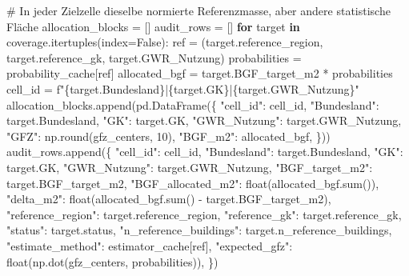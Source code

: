 \documentclass[
  ngerman,
  a4paper,
  DIV=11]{scrreprt}
\newenvironment{Shaded}{\begin{snugshade}}{\end{snugshade}}
\newcommand{\BuiltInTok}[1]{\textcolor[rgb]{0.00,0.23,0.31}{#1}}
\newcommand{\CommentTok}[1]{\textcolor[rgb]{0.37,0.37,0.37}{#1}}
\newcommand{\ControlFlowTok}[1]{\textcolor[rgb]{0.00,0.23,0.31}{\textbf{#1}}}
\newcommand{\DecValTok}[1]{\textcolor[rgb]{0.68,0.00,0.00}{#1}}
\newcommand{\KeywordTok}[1]{\textcolor[rgb]{0.00,0.23,0.31}{\textbf{#1}}}
\newcommand{\NormalTok}[1]{\textcolor[rgb]{0.00,0.23,0.31}{#1}}
\newcommand{\OperatorTok}[1]{\textcolor[rgb]{0.37,0.37,0.37}{#1}}
\newcommand{\SpecialCharTok}[1]{\textcolor[rgb]{0.37,0.37,0.37}{#1}}
\newcommand{\SpecialStringTok}[1]{\textcolor[rgb]{0.13,0.47,0.30}{#1}}
\newcommand{\StringTok}[1]{\textcolor[rgb]{0.13,0.47,0.30}{#1}}
\newcommand{\VariableTok}[1]{\textcolor[rgb]{0.07,0.07,0.07}{#1}}
\begin{document}
\begin{Shaded}
\begin{Highlighting}[]
\CommentTok{\# In jeder Zielzelle dieselbe normierte Referenzmasse, aber andere statistische Fläche}
\NormalTok{allocation\_blocks }\OperatorTok{=}\NormalTok{ []}
\NormalTok{audit\_rows }\OperatorTok{=}\NormalTok{ []}
\ControlFlowTok{for}\NormalTok{ target }\KeywordTok{in}\NormalTok{ coverage.itertuples(index}\OperatorTok{=}\VariableTok{False}\NormalTok{):}
\NormalTok{    ref }\OperatorTok{=}\NormalTok{ (target.reference\_region, target.reference\_gk, target.GWR\_Nutzung)}
\NormalTok{    probabilities }\OperatorTok{=}\NormalTok{ probability\_cache[ref]}
\NormalTok{    allocated\_bgf }\OperatorTok{=}\NormalTok{ target.BGF\_target\_m2 }\OperatorTok{*}\NormalTok{ probabilities}
\NormalTok{    cell\_id }\OperatorTok{=} \SpecialStringTok{f"}\SpecialCharTok{\{}\NormalTok{target}\SpecialCharTok{.}\NormalTok{Bundesland}\SpecialCharTok{\}}\SpecialStringTok{|}\SpecialCharTok{\{}\NormalTok{target}\SpecialCharTok{.}\NormalTok{GK}\SpecialCharTok{\}}\SpecialStringTok{|}\SpecialCharTok{\{}\NormalTok{target}\SpecialCharTok{.}\NormalTok{GWR\_Nutzung}\SpecialCharTok{\}}\SpecialStringTok{"}
\NormalTok{    allocation\_blocks.append(pd.DataFrame(\{}
        \StringTok{"cell\_id"}\NormalTok{: cell\_id, }\StringTok{"Bundesland"}\NormalTok{: target.Bundesland, }\StringTok{"GK"}\NormalTok{: target.GK,}
        \StringTok{"GWR\_Nutzung"}\NormalTok{: target.GWR\_Nutzung, }\StringTok{"GFZ"}\NormalTok{: np.}\BuiltInTok{round}\NormalTok{(gfz\_centers, }\DecValTok{10}\NormalTok{),}
        \StringTok{"BGF\_m2"}\NormalTok{: allocated\_bgf,}
\NormalTok{    \}))}
\NormalTok{    audit\_rows.append(\{}
        \StringTok{"cell\_id"}\NormalTok{: cell\_id, }\StringTok{"Bundesland"}\NormalTok{: target.Bundesland, }\StringTok{"GK"}\NormalTok{: target.GK,}
        \StringTok{"GWR\_Nutzung"}\NormalTok{: target.GWR\_Nutzung, }\StringTok{"BGF\_target\_m2"}\NormalTok{: target.BGF\_target\_m2,}
        \StringTok{"BGF\_allocated\_m2"}\NormalTok{: }\BuiltInTok{float}\NormalTok{(allocated\_bgf.}\BuiltInTok{sum}\NormalTok{()),}
        \StringTok{"delta\_m2"}\NormalTok{: }\BuiltInTok{float}\NormalTok{(allocated\_bgf.}\BuiltInTok{sum}\NormalTok{() }\OperatorTok{{-}}\NormalTok{ target.BGF\_target\_m2),}
        \StringTok{"reference\_region"}\NormalTok{: target.reference\_region, }\StringTok{"reference\_gk"}\NormalTok{: target.reference\_gk,}
        \StringTok{"status"}\NormalTok{: target.status, }\StringTok{"n\_reference\_buildings"}\NormalTok{: target.n\_reference\_buildings,}
        \StringTok{"estimate\_method"}\NormalTok{: estimator\_cache[ref],}
        \StringTok{"expected\_gfz"}\NormalTok{: }\BuiltInTok{float}\NormalTok{(np.dot(gfz\_centers, probabilities)),}
\NormalTok{    \})}


\end{Highlighting}
\end{Shaded}
\end{document}
